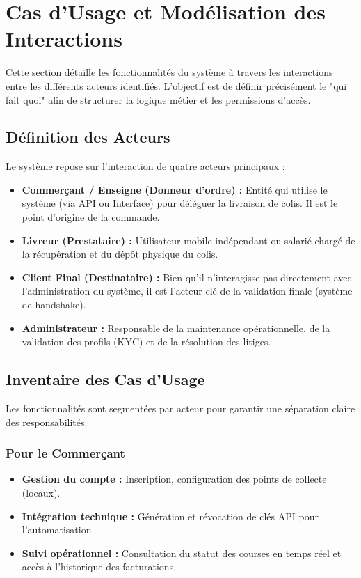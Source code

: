 \newpage

\section{Cas d'Usage et Modélisation des Interactions}
\label{sec:cas_usages}

Cette section détaille les fonctionnalités du système à travers les interactions entre les différents acteurs identifiés. L'objectif est de définir précisément le "qui fait quoi" afin de structurer la logique métier et les permissions d'accès.

\subsection{Définition des Acteurs}

Le système repose sur l'interaction de quatre acteurs principaux :

\begin{itemize}
    \item \textbf{Commerçant / Enseigne (Donneur d'ordre) :} Entité qui utilise le système (via API ou Interface) pour déléguer la livraison de colis. Il est le point d'origine de la commande.
    \item \textbf{Livreur (Prestataire) :} Utilisateur mobile indépendant ou salarié chargé de la récupération et du dépôt physique du colis.
    \item \textbf{Client Final (Destinataire) :} Bien qu'il n'interagisse pas directement avec l'administration du système, il est l'acteur clé de la validation finale (système de handshake).
    \item \textbf{Administrateur :} Responsable de la maintenance opérationnelle, de la validation des profils (KYC) et de la résolution des litiges.
\end{itemize}

\subsection{Inventaire des Cas d'Usage}

Les fonctionnalités sont segmentées par acteur pour garantir une séparation claire des responsabilités.

\subsubsection{Pour le Commerçant}
\begin{itemize}
    \item \textbf{Gestion du compte :} Inscription, configuration des points de collecte (locaux).
    \item \textbf{Intégration technique :} Génération et révocation de clés API pour l'automatisation.
    \item \textbf{Suivi opérationnel :} Consultation du statut des courses en temps réel et accès à l'historique des facturations.
\end{itemize}

